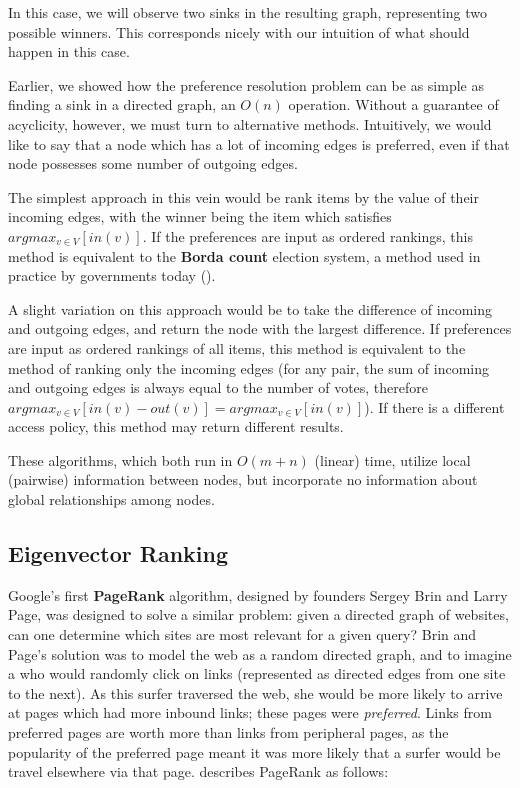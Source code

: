 In this case, we will observe two sinks in the resulting graph, representing two possible winners.
This corresponds nicely with our intuition of what should happen in this case.

\bigskip

Earlier, we showed how the preference resolution problem can be as simple as finding a sink in a directed graph, an $O(n)$ operation.
Without a guarantee of acyclicity, however, we must turn to alternative methods.
Intuitively, we would like to say that a node which has a lot of incoming edges is preferred, even if that node possesses some number of outgoing edges.

The simplest approach in this vein would be rank items by the value of their incoming edges, with the winner being the item which satisfies $argmax_{v \in V}[in(v)]$.
If the preferences are input as ordered rankings, this method is equivalent to the \textbf{Borda count} election system, a method used in practice by governments today (\cite{reilly:2002}).

\bigskip

A slight variation on this approach would be to take the difference of incoming and outgoing edges, and return the node with the largest difference.
If preferences are input as ordered rankings of all items, this method is equivalent to the method of ranking only the incoming edges (for any pair, the sum of incoming and outgoing edges is always equal to the number of votes, therefore $argmax_{v \in V} [in(v) - out(v)] =  argmax_{v \in V}[in(v)]$).
If there is a different access policy, this method may return different results.

These algorithms, which both run in $O(m + n)$ (linear) time, utilize local (pairwise) information between nodes, but incorporate no information about global relationships among nodes.

\subsection{Eigenvector Ranking}

Google's first \textbf{PageRank} algorithm, designed by founders Sergey Brin and Larry Page, was designed to solve a similar problem: given a directed graph of websites, can one determine which sites are most relevant for a given query?
Brin and Page's solution was to model the web as a random directed graph, and to imagine a  who would randomly click on links (represented as directed edges from one site to the next).
As this surfer traversed the web, she would be more likely to arrive at pages which had more inbound links; these pages were \textit{preferred}.
Links from preferred pages are worth more than links from peripheral pages, as the popularity of the preferred page meant it was more likely that a surfer would be travel elsewhere via that page.
\cite{brin} describes PageRank as follows:

